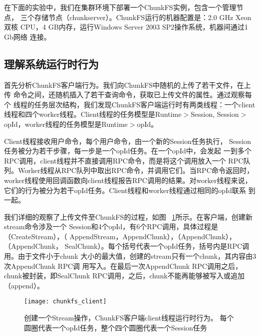 在下面的实验中，我们在集群环境下部署一个ChunkFS实例，包含一个管理节点，
三个存储节点（chunkserver）。ChunkFS运行的机器配置是：2.0 GHz Xeon双核
CPU，4 GB内存，运行Windows Server 2003 SP2操作系统，机器间通过1 Gb网络
连接。

\subsection{理解系统运行时行为}


首先分析ChunkFS客户端行为。我们向ChunkFS中随机的上传了若干文件，在上传
命令之间，还随机插入了若干查询命令，获取已上传文件的属性。通过观察每个
线程的任务层次结构，我们发现ChunkFS客户端运行时有两类线程：一个client
线程和四个worker线程。Client线程的任务模型是Runtime$>$Session,
Session$>$opId，worker线程的任务模型是Runtime$>$opId。

Client线程接收用户命令，每个用户命令，由一个新的Session任务执行，
Session任务被分为若干步骤，每一步是一个opId任务。在一个opId中，会发起
一到多个RPC调用，client线程并不直接调用RPC命令，而是将这个调用放入一个
RPC队列。Worker线程从RPC队列中取出RPC命令，并调用它们。当RPC命令返回时，
worker线程使用回调函数向client线程报告RPC调用的结果。对worker线程来说，
它们的行为被分为若干opId任务。Client线程和worker线程通过相同的opId联系
到一起。

我们详细的观察了上传文件至ChunkFS的过程，如图~
\ref{fig:chunkfs_client}所示。在客户端，创建新stream命令涉及一个
Session和4个opId，有6个RPC调用，具体过程是（Create\-Stream），（
Append\-Stream，Append\-Chunk），（Append\-Chunk），（Append\-Chunk，
Seal\-Chunk）。每个括号代表一个opId任务，括号内是RPC调用。由于文件小于chunk
大小的最大值，创建的stream只有一个chunk，其内容由3次Append\-Chunk RPC调
用写入。在最后一次Append\-Chunk RPC调用之后，chunk被封装，即Seal\-Chunk
RPC调用，之后，chunk不能再能够被写入或追加（append）。

\begin{figure}[htbp]
  \centering
  \begin{minipage}{0.6\linewidth}
    \centering
    \texttt{[image: chunkfs\_client]}
    \caption{创建一个Stream操作，ChunkFS客户端client线程运行时行为。
    每个圆圈代表一个opId任务，整个四个圆圈代表一个Session任务}
    \label{fig:chunkfs_client}
  \end{minipage}
\end{figure}

